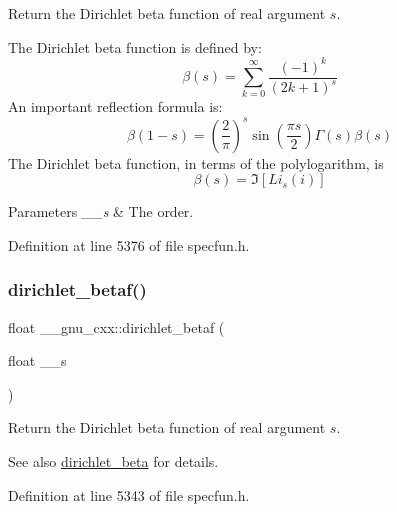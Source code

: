 Return the Dirichlet beta function of real argument $ s $.

The Dirichlet beta function is defined by\+: \[ \beta(s) = \sum_{k=0}^\infty \frac{(-1)^k}{(2k+1)^s} \] An important reflection formula is\+: \[ \beta(1-s) = \left( \frac{2}{\pi}\right)^s \sin(\frac{\pi s}{2}) \Gamma(s) \beta(s) \] The Dirichlet beta function, in terms of the polylogarithm, is \[ \beta(s) = \Im[Li_s(i)] \]


\begin{DoxyParams}{Parameters}
{\em \+\_\+\+\_\+s} & The order. \\
\hline
\end{DoxyParams}


Definition at line 5376 of file specfun.\+h.

\mbox{\label{group__gnu__math__spec__func_ga9bb40e20b18e3eb822e70af955940830}} 
\subsubsection{\texorpdfstring{dirichlet\+\_\+betaf()}{dirichlet\_betaf()}}
{\footnotesize\ttfamily float \+\_\+\+\_\+gnu\+\_\+cxx\+::dirichlet\+\_\+betaf (\begin{DoxyParamCaption}\item[{float}]{\+\_\+\+\_\+s }\end{DoxyParamCaption})\hspace{0.3cm}{\ttfamily [inline]}}

Return the Dirichlet beta function of real argument $ s $.

\begin{DoxySeeAlso}{See also}
\hyperlink{group__gnu__math__spec__func_ga87466a2d429a2815d794acc21c882b08}{dirichlet\+\_\+beta} for details. 
\end{DoxySeeAlso}


Definition at line 5343 of file specfun.\+h.

\mbox{\label{group__gnu__math__spec__func_gaed6fd85a4577f4de66d74742a1850a13}} 
